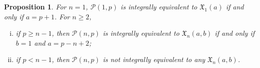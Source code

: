 \documentclass[11pt]{amsart}
\newtheorem{proposition}[theorem]{Proposition}
\theoremstyle{definition}
\newcommand{\0}{\emptyset}
\newcommand{\X}{\mathfrak{X}}
\begin{document}
\begin{proposition}\label{prop:x-pfp_pp} 
For $n=1$, $\mathcal{P}(1,p)$ is integrally equivalent to $\X_{1}(a)$ if and only if $a = p + 1$.
For $n \geq 2$,
\begin{enumerate}[(i)]
    \item if $p \geq n-1$, then $\mathcal{P}(n,p)$ is integrally equivalent to $\X_{n}(a,b)$ if and only if $b=1$ and $a = p - n +2$;
    \item if $p < n-1$, then $\mathcal{P}(n,p)$ is not integrally equivalent to any $\X_{n}(a,b)$.
\end{enumerate}

\end{proposition}




\end{document}
